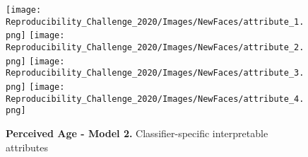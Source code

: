 \begin{figure}[hbt!]
  \texttt{[image: Reproducibility\_Challenge\_2020/Images/NewFaces/attribute\_1.png]}
\endminipage\hfill
{}
  \texttt{[image: Reproducibility\_Challenge\_2020/Images/NewFaces/attribute\_2.png]}
\endminipage\hfill
{}
  \texttt{[image: Reproducibility\_Challenge\_2020/Images/NewFaces/attribute\_3.png]}
\endminipage\hfill
{}
  \texttt{[image: Reproducibility\_Challenge\_2020/Images/NewFaces/attribute\_4.png]}
\endminipage\hfill
\caption{\textbf{Perceived Age - Model 2.} Classifier-specific interpretable attributes}
\label{fig: introduction}
\end{figure}